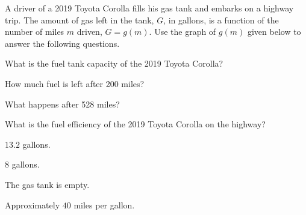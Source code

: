 \begin{exercise}
A driver of a 2019 Toyota Corolla fills his gas tank and embarks on a highway trip. The amount of gas left in the tank, $G$, in gallons, is a function of the number of miles $m$ driven, $G=g(m)$. Use the graph of $g(m)$ given below to answer the following questions. 


\begin{center}
\end{center}




\begin{parts}
\item What is the fuel tank capacity of the 2019 Toyota Corolla?

\item How much fuel is left after 200 miles?

\item What happens after 528 miles?

\item What is the fuel efficiency of the 2019 Toyota Corolla on the highway?
\end{parts}
\end{exercise}


\begin{solution}
\begin{parts}
\item $13.2$ gallons.
\item $8$ gallons.
\item The gas tank is empty.
\item Approximately $40$ miles per gallon.
\end{parts}
\end{solution}




